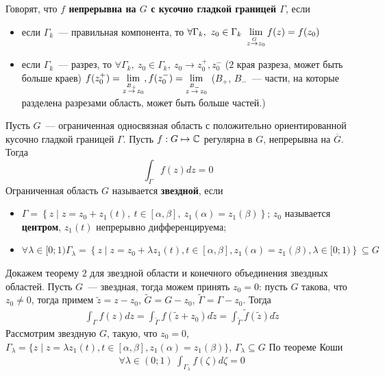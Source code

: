 Говорят, что \textbf{$f$ непрерывна на $G$ с кусочно гладкой границей $\Gamma$},
если
\begin{itemize}
    \item если $\Gamma_k$~--- правильная компонента, то $\forall \Gamma_k, \ z_0
    \in \Gamma_k \ \dst \lim_{z \overset{G}{\to} z_0}f(z) = f(z_0)$
    \item если $\Gamma_k$~--- разрез, то $\forall \Gamma_k, \ z_0 \in \Gamma_k,
    \ z_0 \to z_0^+, z_0^-$ ($2$ края разреза, может быть больше краев)
    $f(z_0^+) = \displaystyle \lim_{z \overset{B_+}{\to} z_0}, f(z_0^-) = \displaystyle \lim_{z
      \overset{B_-}{\to}z_0}$ ($B_+$, $B_-$~--- части, на которые разделена
    разрезами область, может быть больше частей.)
\end{itemize}
\theorem
Пусть $G$~--- ограниченная односвязная область с положительно ориентированной
кусочно гладкой границей $\Gamma$. Пусть $f: G \mapsto \mathbb{C}$ регулярна в $G$,
непрерывна на $\overline{G}$. Тогда
\begin{equation}\label{(7.4)}
  \int_{\Gamma}f(z)dz = 0
\end{equation}
\Def
Ограниченная область $G$ называется \textbf{звездной}, если
\begin{itemize}
    \item $\Gamma = \left\{z \mid z = z_0 + z_1(t), \ t \in [\alpha, \beta], \
        z_1(\alpha) = z_1(\beta) \right\}$; $z_0$ называется \textbf{центром},
    $z_1(t)$ непрерывно дифференцируема;
    \item $\forall \lambda \in [0;1) \Gamma_{\lambda} = \left\{ z \mid z = z_0 +
    \lambda z_1(t), t \in [\alpha, \beta], z_1(\alpha) = z_1(\beta), \lambda \in
    [0;1)\right\} \subseteq G$
\end{itemize}
Докажем теорему $2$ для звездной области и конечного объединения звездных
областей.
\pr
Пусть $G$~--- звездная, тогда можем принять $z_0=0$: пусть $G$ такова, что $z_0
\neq 0$, тогда примем $\tilde{z} = z-z_0$, $\tilde{G} = G-z_0$, $\tilde{\Gamma}
= \Gamma - z_0$. Тогда
\begin{align*}
  & \int_{\Gamma}f(z)dz = \int_{\tilde{\Gamma}}f(\tilde{z}+z_0)d\tilde{z} = \int_{\tilde{\Gamma}}\tilde{f}(\tilde{z})d\tilde{z}
\end{align*}
Рассмотрим звездную $G$, такую, что $z_0 = 0$, $\Gamma_{\lambda} = \{z \mid z =
\lambda z_1(t), t\in[\alpha, \beta], z_1(\alpha) = z_1(\beta)\}$,
$\Gamma_{\lambda}\subseteq G$
По теореме Коши 
\begin{align*}
  & \forall \lambda \in (0;1) \ \int_{\Gamma_\lambda}f(\zeta)d\zeta = 0
\end{align*}
